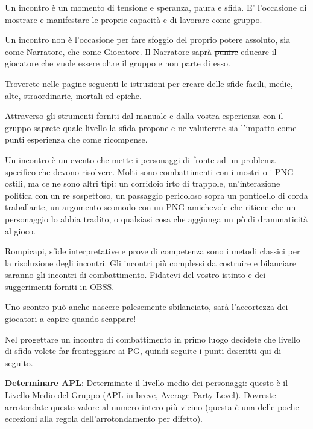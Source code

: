 \begin{multicols}{2}


Un incontro è un momento di tensione e speranza, paura e sfida. E' l'occasione di mostrare e manifestare le proprie capacità e di lavorare come gruppo.

Un incontro non è l'occasione per fare sfoggio del proprio potere assoluto, sia come Narratore, che come Giocatore. Il Narratore saprà \st{punire} educare il giocatore che vuole essere oltre il gruppo e non parte di esso.

Troverete nelle pagine seguenti le istruzioni per creare delle sfide facili, medie, alte, straordinarie, mortali ed epiche.

Attraverso gli strumenti forniti dal manuale e dalla vostra esperienza con il gruppo saprete quale livello la sfida propone e ne valuterete sia l'impatto come punti esperienza che come ricompense.

Un incontro è un evento che mette i personaggi di fronte ad un problema specifico che devono risolvere. Molti sono combattimenti con i mostri o i PNG ostili, ma ce ne sono altri tipi: un corridoio irto di trappole, un'interazione politica con un re sospettoso, un passaggio pericoloso sopra un ponticello di corda traballante, un argomento scomodo con un PNG amichevole che ritiene che un personaggio lo abbia tradito, o qualsiasi cosa che aggiunga un pò di drammaticità al gioco.

Rompicapi, sfide interpretative e prove di competenza sono i metodi classici per la risoluzione degli incontri. Gli incontri più complessi da costruire e bilanciare saranno gli incontri di combattimento. Fidatevi del vostro istinto e dei suggerimenti forniti in OBSS.

Uno scontro può anche nascere palesemente sbilanciato, sarà l'accortezza dei giocatori a capire quando scappare!

Nel progettare un incontro di combattimento in primo luogo decidete che livello di sfida volete far fronteggiare ai PG, quindi seguite i punti descritti qui di seguito.

\textbf{Determinare APL}: Determinate il livello medio dei personaggi: questo è il Livello Medio del Gruppo (APL in breve, Average Party Level). Dovreste arrotondate questo valore al numero intero più vicino (questa è una delle poche eccezioni alla regola dell'arrotondamento per difetto).



\end{multicols}
